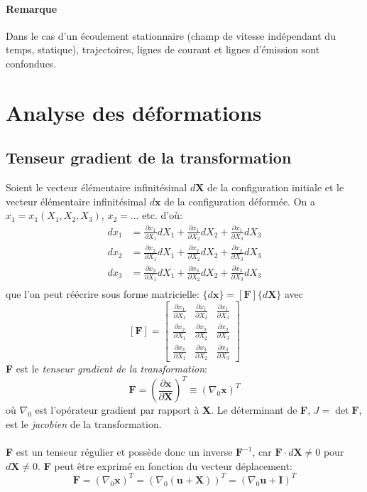 \paragraph{Remarque}Dans le cas d'un écoulement stationnaire (champ de vitesse indépendant du temps, statique), trajectoires, lignes de courant et lignes d'émission sont confondues.
\section{Analyse des déformations}
\subsection{Tenseur gradient de la transformation}
Soient le vecteur élémentaire infinitésimal $d\textbf{X}$ de la configuration initiale et le vecteur élémentaire infinitésimal $d\textbf{x}$ de la configuration déformée. On a $x_1=x_1(X_1, X_2, X_3)$, $x_2=...$ etc. d'où:
$$\begin{aligned}
dx_1&=\frac{\partial x_1}{\partial X_1}dX_1+\frac{\partial x_1}{\partial X_2}dX_2+\frac{\partial x_1}{\partial X_3}dX_3\\
dx_2&=\frac{\partial x_2}{\partial X_1}dX_1+\frac{\partial x_2}{\partial X_2}dX_2+\frac{\partial x_2}{\partial X_3}dX_3\\
dx_3&=\frac{\partial x_3}{\partial X_1}dX_1+\frac{\partial x_3}{\partial X_2}dX_2+\frac{\partial x_3}{\partial X_3}dX_3\\
\end{aligned}$$  
que l'on peut réécrire sous forme matricielle: $\{d\textbf{x}\}=[\textbf{F}]\{d\textbf{X}\}$ avec 
$$[\textbf{F}]=\left[\begin{array}{ccc}
\frac{\partial x_1}{\partial X_1}&\frac{\partial x_1}{\partial X_2}&\frac{\partial x_1}{\partial X_3}\\
\frac{\partial x_2}{\partial X_1}&\frac{\partial x_2}{\partial X_2}&\frac{\partial x_2}{\partial X_3}\\
\frac{\partial x_3}{\partial X_1}&\frac{\partial x_3}{\partial X_2}&\frac{\partial x_3}{\partial X_3}
\end{array}\right]$$
\textbf{F} est le \emph{tenseur gradient de la transformation}: $$\textbf{F}=\left(\frac{\partial \textbf{x}}{\partial \textbf{X}}\right)^T\equiv (\nabla_0\textbf{x})^T$$ où $\nabla_0$ est l'opérateur gradient par rapport à \textbf{X}. Le déterminant de \textbf{F}, $J=\det \textbf{F}$, est le \emph{jacobien} de la transformation.
\paragraph{} 
\textbf{F} est un tenseur régulier et possède donc un inverse $ \textbf{F}^{-1}$, car $\textbf{F}\cdot d\textbf{X}\neq 0$ pour $d\textbf{X} \neq 0$. \textbf{F} peut être exprimé en fonction du vecteur déplacement:
$$\textbf{F}=(\nabla_0 \textbf{x})^T=(\nabla_0 (\textbf{u}+\textbf{X}))^T=(\nabla_0 \textbf{u}+\textbf{I})^T$$


